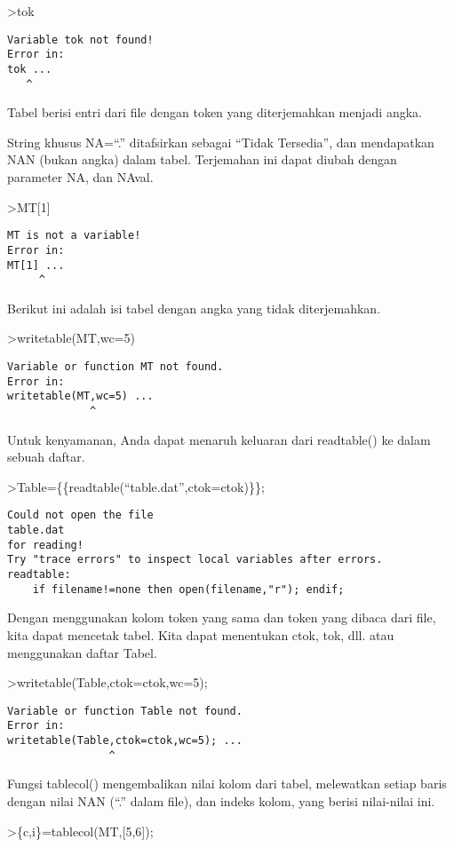 \documentclass[
]{book}
\begin{document}
\textgreater tok

\begin{verbatim}
Variable tok not found!
Error in:
tok ...
   ^
\end{verbatim}

Tabel berisi entri dari file dengan token yang diterjemahkan menjadi angka.

String khusus NA=``.'' ditafsirkan sebagai ``Tidak Tersedia'', dan mendapatkan NAN (bukan angka) dalam tabel. Terjemahan ini dapat diubah dengan parameter NA, dan NAval.

\textgreater MT{[}1{]}

\begin{verbatim}
MT is not a variable!
Error in:
MT[1] ...
     ^
\end{verbatim}

Berikut ini adalah isi tabel dengan angka yang tidak diterjemahkan.

\textgreater writetable(MT,wc=5)

\begin{verbatim}
Variable or function MT not found.
Error in:
writetable(MT,wc=5) ...
             ^
\end{verbatim}

Untuk kenyamanan, Anda dapat menaruh keluaran dari readtable() ke dalam sebuah daftar.

\textgreater Table=\{\{readtable(``table.dat'',ctok=ctok)\}\};

\begin{verbatim}
Could not open the file
table.dat
for reading!
Try "trace errors" to inspect local variables after errors.
readtable:
    if filename!=none then open(filename,"r"); endif;
\end{verbatim}

Dengan menggunakan kolom token yang sama dan token yang dibaca dari file, kita dapat mencetak tabel. Kita dapat menentukan ctok, tok, dll. atau menggunakan daftar Tabel.

\textgreater writetable(Table,ctok=ctok,wc=5);

\begin{verbatim}
Variable or function Table not found.
Error in:
writetable(Table,ctok=ctok,wc=5); ...
                ^
\end{verbatim}

Fungsi tablecol() mengembalikan nilai kolom dari tabel, melewatkan setiap baris dengan nilai NAN (``.'' dalam file), dan indeks kolom, yang berisi nilai-nilai ini.

\textgreater\{c,i\}=tablecol(MT,{[}5,6{]});
\end{document}
